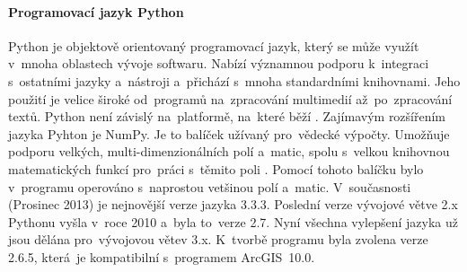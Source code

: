 



% 

\paragraph{Programovací jazyk Python} \label{sec:python}
  Python je objektově orientovaný programovací jazyk, který se může využít v~mnoha oblastech vývoje softwaru. Nabízí významnou podporu k~integraci s~ostatními jazyky a~nástroji a~přichází s~mnoha standardními knihovnami. Jeho použití je velice široké od~programů na~zpracování multimedií až~po~zpracování textů. Python není závislý na~platformě, na~které běží \cite{python}. Zajímavým rozšířením jazyka Pyhton je NumPy. Je to balíček užívaný pro~vědecké výpočty. Umožňuje podporu velkých, multi-dimenzionálních polí a~matic, spolu s~velkou knihovnou matematických funkcí pro~práci s~těmito poli \cite{numpy}. Pomocí tohoto balíčku bylo v~programu operováno s~naprostou vetšinou polí a~matic. V~současnosti (Prosinec 2013) je nejnovější verze jazyka 3.3.3. Poslední verze vývojové větve 2.x Pythonu vyšla v~roce 2010 a~byla to~verze 2.7. Nyní všechna vylepšení jazyka už jsou dělána pro~vývojovou větev 3.x. K~tvorbě programu byla zvolena verze 2.6.5, která~je kompatibilní s~programem ArcGIS~10.0.     

